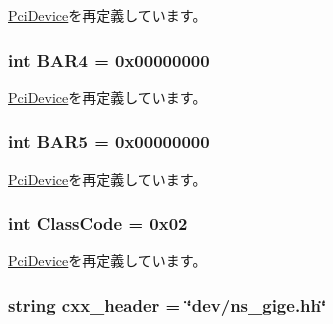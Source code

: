 \hyperlink{classPci_1_1PciDevice_a8d29325a3868fc855f430913941a20b8}{PciDevice}を再定義しています。\hypertarget{classEthernet_1_1NSGigE_a563ca469426838df82cc266c302a0a70}{
\subsubsection[{BAR4}]{\setlength{\rightskip}{0pt plus 5cm}int {\bf BAR4} = 0x00000000}}
\label{classEthernet_1_1NSGigE_a563ca469426838df82cc266c302a0a70}


\hyperlink{classPci_1_1PciDevice_a50a34d2b9855ad231f8b6dab39c0641a}{PciDevice}を再定義しています。\hypertarget{classEthernet_1_1NSGigE_af86e51daee4f9d86104270e5ed9a0890}{
\subsubsection[{BAR5}]{\setlength{\rightskip}{0pt plus 5cm}int {\bf BAR5} = 0x00000000}}
\label{classEthernet_1_1NSGigE_af86e51daee4f9d86104270e5ed9a0890}


\hyperlink{classPci_1_1PciDevice_a9bc605ff9fcc9424477afc81fa73422e}{PciDevice}を再定義しています。\hypertarget{classEthernet_1_1NSGigE_a7d0125d1930fad943a6a7471da0317ad}{
\subsubsection[{ClassCode}]{\setlength{\rightskip}{0pt plus 5cm}int {\bf ClassCode} = 0x02}}
\label{classEthernet_1_1NSGigE_a7d0125d1930fad943a6a7471da0317ad}


\hyperlink{classPci_1_1PciDevice_a9222bb7cddf99c695b0430f560974967}{PciDevice}を再定義しています。\hypertarget{classEthernet_1_1NSGigE_a17da7064bc5c518791f0c891eff05fda}{
\subsubsection[{cxx\_\-header}]{\setlength{\rightskip}{0pt plus 5cm}string {\bf cxx\_\-header} = \char`\"{}dev/ns\_\-gige.hh\char`\"{}}}
\label{classEthernet_1_1NSGigE_a17da7064bc5c518791f0c891eff05fda}


